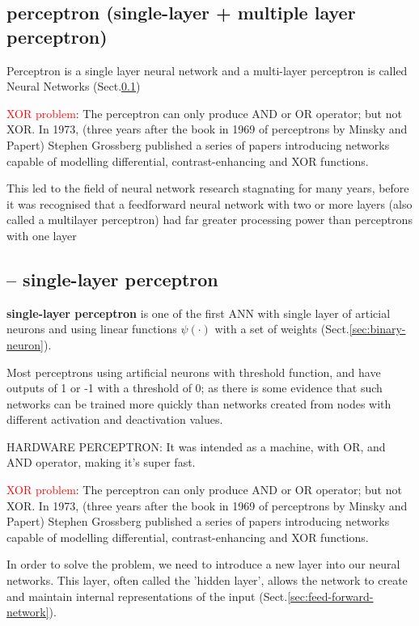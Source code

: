 \subsection{perceptron (single-layer + multiple layer perceptron)}
\label{sec:perceptron}

Perceptron is a single layer neural network and a multi-layer perceptron is
called Neural Networks (Sect.\ref{sec:perceptron})


\textcolor{red}{XOR problem}: The perceptron can only produce AND or OR
operator; but not XOR. In 1973, (three years after the book in 1969 of
perceptrons by Minsky and Papert) Stephen Grossberg published a series of papers
introducing networks capable of modelling differential, contrast-enhancing and
XOR functions.


This led to the field of neural network research stagnating for many years, before it was
recognised that a feedforward neural network with two or more layers (also
called a multilayer perceptron) had far greater processing power than
perceptrons with one layer

\subsection{-- single-layer perceptron}
 
{\bf single-layer perceptron} is one of the first ANN with single layer of
articial neurons and using linear functions $\psi(\cdot)$ with a set of weights
(Sect.\ref{sec:binary-neuron}).

Most perceptrons using artificial neurons with threshold function, and have
outputs of 1 or -1 with a threshold of 0; as there is some evidence that such
networks can be trained more quickly than networks created from nodes with
different activation and deactivation values.
  
HARDWARE PERCEPTRON: It was intended as a machine, with OR, and AND operator,
making it's super fast.

\textcolor{red}{XOR problem}: The perceptron can only produce AND or OR
operator; but not XOR. In 1973, (three years after the book in 1969 of
perceptrons by Minsky and Papert) Stephen Grossberg published a series of papers
introducing networks capable of modelling differential, contrast-enhancing and
XOR functions.

In order to solve the problem, we need to introduce a new layer into our neural
networks. This layer, often called the 'hidden layer', allows the network to
create and maintain internal representations of the input
(Sect.\ref{sec:feed-forward-network}).


